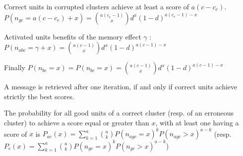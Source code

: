 \documentclass[english,10pt,twocolumn]{IEEEtran}
\theoremstyle{definition}
\begin{document}
	Correct units in corrupted clusters achieve at least a score of $a(c - c_e)$. 
	$P(n_{ge} = a(c - c_e) + x) = {a (c_e - 1) \choose x} d^x (1-d)^{a (c_e - 1)-x}$
	
	
	Activated units benefits of the memory effect $\gamma$ :	\\
	$P(n_{abe} = \gamma + x) = {a(c - 1) \choose x} d^x (1-d)^{a(c-1)-x}$
	
	
	Finally $P(n_{be} = x) = P(n_{bc} = x) = {a(c - 1) \choose x} d^x (1-d)^{a(c- 1) -x}$	
	
	A message is retrieved after one iteration, if and only if correct units achieve strictly the best scores.	
	
	

	
	
	
	
	The probability for all good units of a correct cluster (resp. of an erroneous cluster) to achieve a score equal or greater than $x$, with at least one having a score of $x$ is $P_{ac} (x) = \sum_{k = 1}^{a} { a \choose k }   P(n_{agc} = x)^k P(n_{agc} > x)^{a-k}$ (resp. $P_e(x) = \sum_{k = 1}^a { a \choose k } P(n_{ge} = x)^k P(n_{ge} > x)^{a-k}$)

	
	
\end{document}
